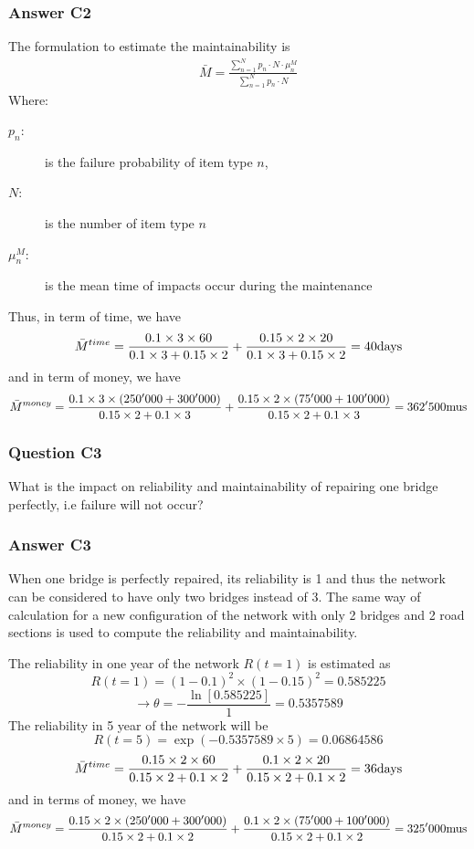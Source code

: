 \subsubsection{Answer C2}
The formulation to estimate the maintainability is
\begin{eqnarray}
&& \bar M = \frac{{\sum\limits_{n = 1}^N {{p_n} \cdot N \cdot \mu _n^M}
}}{{\sum\limits_{n = 1}^N {{p_n} \cdot N} }}
\label{eq-reliability-a26}
\end{eqnarray}
Where:
\begin{adjustwidth}{1cm}{}
\begin{description}
\item[${p_n}$:] is the failure probability of item type $n$,
\item[$N$:] is the number of item type $n$ 
\item[$\mu _n^M$:] is the mean time of impacts occur during the maintenance
\end{description}
\end{adjustwidth}
Thus, in term of time, we have
\[
{\bar M^{time}} = \frac{{0.1 \times 3 \times 60}}{{0.1 \times 3 + 0.15 \times
2}} + \frac{{0.15 \times 2 \times 20}}{{0.1 \times 3 + 0.15 \times 2}} = 40{\rm{
days}}
\]
and in term of money, we have
\[
{\bar M^{money}} = \frac{{0.1 \times 3 \times (250'000 + 300'000)}}{{0.15 \times
2 + 0.1 \times 3}} + \frac{{0.15 \times 2 \times (75'000 + 100'000)}}{{0.15
\times 2 + 0.1 \times 3}} = 362'500{\rm{ mus}}
\]
\subsubsection{Question C3}
What is the impact on reliability and maintainability of repairing one bridge
perfectly, i.e failure will not occur?
\subsubsection{Answer C3}
When one bridge is perfectly repaired, its reliability is 1 and thus the network
can be considered to have only two bridges instead of 3. The same way of
calculation for a new configuration of the network with only 2 bridges and 2 road
sections is used to compute the reliability and maintainability.

The reliability in one year of the network $R(t = 1)$ is estimated as
\[
R(t = 1) = (1-0.1)^2 \times (1-0.15)^2 = 0.585225
\]
\[
\to \theta  =  - \frac{{\ln [0.585225]}}{1} = 0.5357589
\]
The reliability in 5 year of the network will be
\[
R(t = 5) = \exp ( - 0.5357589 \times 5) = 0.06864586
\]
\[
{\bar M^{time}} = \frac{{0.15 \times 2 \times 60}}{{0.15 \times 2 + 0.1 \times
2}} + \frac{{0.1 \times 2 \times 20}}{{0.15 \times 2 + 0.1 \times 2}} = 36{\rm{
days}}
\]
and in terms of money, we have
\[
{\bar M^{money}} = \frac{{0.15 \times 2 \times (250'000 + 300'000)}}{{0.15
\times 2 + 0.1 \times 2}} + \frac{{0.1 \times 2 \times (75'000 + 100'000)}}{{0.15
\times 2 + 0.1 \times 2}} = 325'000{\rm{ mus}}
\]
